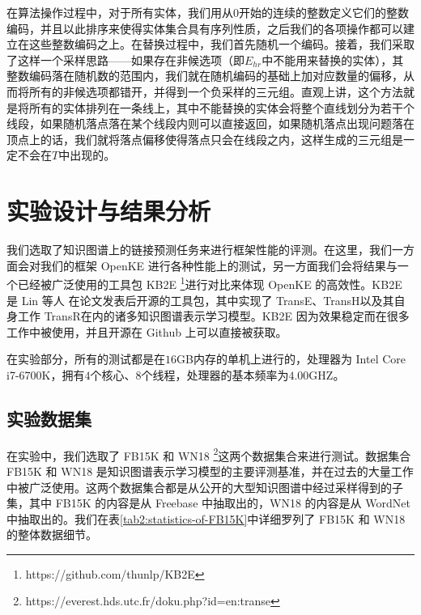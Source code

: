 在算法操作过程中，对于所有实体，我们用从$0$开始的连续的整数定义它们的整数编码，并且以此排序来使得实体集合具有序列性质，之后我们的各项操作都可以建立在这些整数编码之上。在替换过程中，我们首先随机一个编码。接着，我们采取了这样一个采样思路——如果存在非候选项（即$E_{hr}$中不能用来替换的实体），其整数编码落在随机数的范围内，我们就在随机编码的基础上加对应数量的偏移，从而将所有的非候选项都错开，并得到一个负采样的三元组。直观上讲，这个方法就是将所有的实体排列在一条线上，其中不能替换的实体会将整个直线划分为若干个线段，如果随机落点落在某个线段内则可以直接返回，如果随机落点出现问题落在顶点上的话，我们就将落点偏移使得落点只会在线段之内，这样生成的三元组是一定不会在$T$中出现的。

\section{实验设计与结果分析}

我们选取了知识图谱上的链接预测任务来进行框架性能的评测。在这里，我们一方面会对我们的框架 OpenKE 进行各种性能上的测试，另一方面我们会将结果与一个已经被广泛使用的工具包 KB2E \footnote{https://github.com/thunlp/KB2E}进行对比来体现 OpenKE 的高效性。KB2E 是 Lin 等人\cite{lin2015learning} 在论文发表后开源的工具包，其中实现了 TransE、TransH以及其自身工作 TransR在内的诸多知识图谱表示学习模型。KB2E 因为效果稳定而在很多工作中被使用，并且开源在 Github 上可以直接被获取。

在实验部分，所有的测试都是在$16$GB内存的单机上进行的，处理器为 Intel Core i7-6700K，拥有$4$个核心、$8$个线程，处理器的基本频率为$4.00$GHZ。

\subsection{实验数据集}

在实验中，我们选取了 FB15K 和 WN18 \footnote{https://everest.hds.utc.fr/doku.php?id=en:transe}这两个数据集合来进行测试。数据集合 FB15K 和 WN18 是知识图谱表示学习模型的主要评测基准，并在过去的大量工作中被广泛使用。这两个数据集合都是从公开的大型知识图谱中经过采样得到的子集，其中 FB15K 的内容是从 Freebase 中抽取出的，WN18 的内容是从 WordNet 中抽取出的。我们在表\ref{tab2:statistics-of-FB15K}中详细罗列了 FB15K 和 WN18 的整体数据细节。

\begin{table}[htb]
\centering
\caption{FB15K 和 WN18 的数据细节}
\label{tab2:statistics-of-FB15K}
\end{table}

